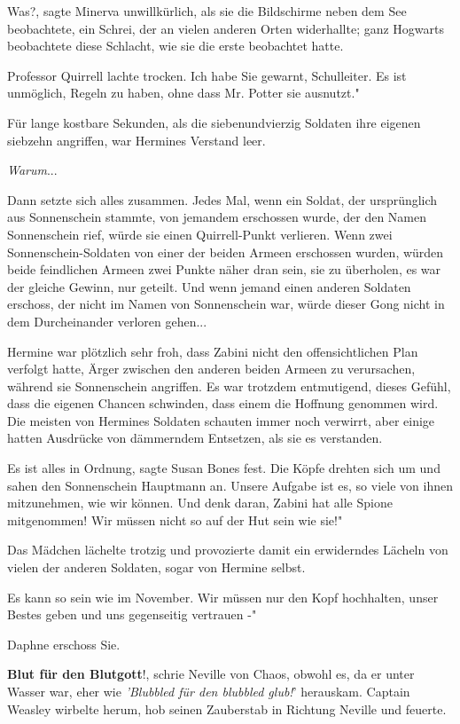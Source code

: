 \glqq Was?\grqq{}, sagte Minerva unwillkürlich, als sie die Bildschirme neben
dem See beobachtete, ein Schrei, der an vielen anderen Orten widerhallte; ganz
Hogwarts beobachtete diese Schlacht, wie sie die erste beobachtet hatte.

Professor Quirrell lachte trocken. \glqq Ich habe Sie gewarnt, Schulleiter. Es
ist unmöglich, Regeln zu haben, ohne dass Mr. Potter sie ausnutzt."


Für lange kostbare Sekunden, als die siebenundvierzig Soldaten ihre eigenen
siebzehn angriffen, war Hermines Verstand leer.

\emph{Warum}...

Dann setzte sich alles zusammen. Jedes Mal, wenn ein Soldat, der ursprünglich
aus Sonnenschein stammte, von jemandem erschossen wurde, der den Namen
Sonnenschein rief, würde sie einen Quirrell-Punkt verlieren. Wenn zwei
Sonnenschein-Soldaten von einer der beiden Armeen erschossen wurden, würden
beide feindlichen Armeen zwei Punkte näher dran sein, sie zu überholen, es war
der gleiche Gewinn, nur geteilt. Und wenn jemand einen anderen Soldaten
erschoss, der nicht im Namen von Sonnenschein war, würde dieser Gong nicht in
dem Durcheinander verloren gehen...

Hermine war plötzlich sehr froh, dass Zabini nicht den offensichtlichen Plan
verfolgt hatte, Ärger zwischen den anderen beiden Armeen zu verursachen, während
sie Sonnenschein angriffen. Es war trotzdem entmutigend, dieses Gefühl, dass die
eigenen Chancen schwinden, dass einem die Hoffnung genommen wird. Die meisten
von Hermines Soldaten schauten immer noch verwirrt, aber einige hatten Ausdrücke
von dämmerndem Entsetzen, als sie es verstanden.

\glqq Es ist alles in Ordnung\grqq{}, sagte Susan Bones fest. Die Köpfe drehten
sich um und sahen den Sonnenschein Hauptmann an. \glqq Unsere Aufgabe ist es, so
viele von ihnen mitzunehmen, wie wir können. Und denk daran, Zabini hat alle
Spione mitgenommen! Wir müssen nicht so auf der Hut sein wie sie!"

Das Mädchen lächelte trotzig und provozierte damit ein erwiderndes Lächeln von
vielen der anderen Soldaten, sogar von Hermine selbst.

\glqq Es kann so sein wie im November. Wir müssen nur den Kopf hochhalten, unser
Bestes geben und uns gegenseitig vertrauen -"

Daphne erschoss Sie.


\glqq \textbf{Blut für den Blutgott}!\grqq{}, schrie Neville von Chaos, obwohl
es, da er unter Wasser war, eher wie \emph{'Blubbled für den blubbled glub!}'
herauskam. Captain Weasley wirbelte herum, hob seinen Zauberstab in Richtung
Neville und feuerte.

